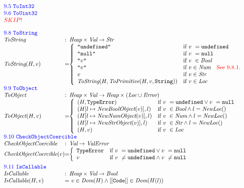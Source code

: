 \[\begin{array}{l@{}l@{}ll}
\multicolumn{3}{l}{\mbox{\inblue 9.5 {\tt ToInt32}}}\\
\multicolumn{3}{l}{\mbox{\inblue 9.6 {\tt ToUint32}}}\\
{\inred SKIP!}\\[1em]


\multicolumn{3}{l}{\mbox{\inblue 9.8 {\tt ToString}}}\\
\hf{ToString} & :& \Heap \times \Val \rightarrow \Str \\
\hf{ToString}(H,v) &=&
\left\{ \begin{array}{ll}
\verb+"undefined"+ &\mbox{if $v\ = \undef$}\\
\verb+"null"+ &\mbox{if $v\ = \nullK$}\\
\verb+"+v\verb+"+&\mbox{if $v\ \in \Bool$}\\
\verb+"+v\verb+"+ &\mbox{if $v\in\Num$\quad{\inred See 9.8.1.}}\\
v &\mbox{if $v\in\Str$}\\
\hf{ToString}(H,\hf{ToPrimitive}(H,v,\verb+String+)) &\mbox{if $v\in\Loc$}\\
\end{array}
\right.
\\[1em]

\multicolumn{3}{l}{\mbox{\inblue 9.9 {\tt ToObject}}}\\
\hf{ToObject} & :& \Heap \times \Val \rightarrow \Heap \times (\Loc \cup \Error) \\
\hf{ToObject}(H, v) &=&
\left\{ \begin{array}{ll}
(H, \te) &\mbox{if $v\ = \undef \vee v\ = \nullK$}\\
(H[l\mapsto\hf{NewBoolObject}(v)], l)&\mbox{if $v\ \in \Bool\wedge l = \hf{NewLoc}()$}\\
(H[l\mapsto\hf{NewNumObject}(v)], l)&\mbox{if $v\ \in \Num\wedge l = \hf{NewLoc}()$}\\
(H[l\mapsto\hf{NewStrObject}(v)], l)&\mbox{if $v\ \in \Str\wedge l = \hf{NewLoc}()$}\\
(H, v) &\mbox{if $v\ \in \Loc$}\\
\end{array}
\right.
\\[1em]

\multicolumn{3}{l}{\mbox{\inblue 9.10 {\tt CheckObjectCoercible}}}\\
\hf{CheckObjectCoercible} & :& \Val \rightarrow \ValError \\
\hf{CheckObjectCoercible}(v) &=&
\left\{ \begin{array}{ll}
\te &\mbox{if $v\ = \undef \vee v\ = \nullK$}\\
v &\mbox{if $v\ \not= \undef \wedge v\ \not= \nullK$}\\
\end{array}
\right.
\\[1em]

\multicolumn{3}{l}{\mbox{\inblue 9.11 {\tt IsCallable}}}\\
\hf{IsCallable} & :& \Heap \times \Val \rightarrow \Bool \\
\hf{IsCallable}(H,v) &=&\
v \in \hf{Dom}(H) \wedge {\tt[[Code]]} \in \hf{Dom}(H(l))
\end{array}
\]



